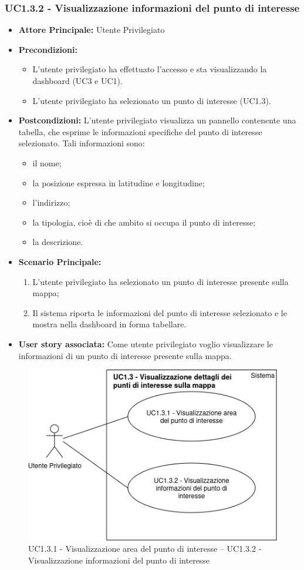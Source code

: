 \documentclass[11pt]{article}
\begin{document}
\begin{justify}
 \subsubsection{\textbf{UC1.3.2 - Visualizzazione informazioni del punto di interesse}}
 \label{UC1.3.2}
 \begin{itemize}
     \item \textbf{Attore Principale:} Utente Privilegiato
     \item \textbf{Precondizioni:}
       \begin{itemize}
            \item L'utente privilegiato ha effettuato l'accesso e sta visualizzando la dashboard (UC3 e UC1).
            \item L'utente privilegiato ha selezionato un punto di interesse (UC1.3).
       \end{itemize}
     \item \textbf{Postcondizioni:} L'utente privilegiato visualizza un pannello contenente una tabella, che esprime le informazioni specifiche del punto di interesse selezionato. Tali informazioni sono:
       \begin{itemize}
       \item il nome;
       \item la posizione espressa in latitudine e longitudine;
       \item l'indirizzo;
       \item la tipologia, cioè di che ambito si occupa il punto di interesse;
       \item la descrizione.
       \end{itemize}
     \item \textbf{Scenario Principale:}
        \begin{enumerate}
          \item L'utente privilegiato ha selezionato un punto di interesse presente sulla mappa;
            \item Il sistema riporta le informazioni del punto di interesse selezionato e le mostra nella dashboard in forma tabellare.
        \end{enumerate}
     \item \textbf{User story associata:} Come utente privilegiato voglio visualizzare le informazioni di un punto di interesse presente sulla mappa. 
 \end{itemize}
\begin{figure}[H]
    \centering
    \includegraphics[width=0.5\linewidth]{UC1.3.1-UC1.3.2image.png}
    \caption{UC1.3.1 - Visualizzazione area del punto di interesse -- UC1.3.2 - Visualizzazione informazioni del punto di interesse}
    \label{fig:UC1.3.1-UC1.3.2}
\end{figure}

\end{justify}
\end{document}
